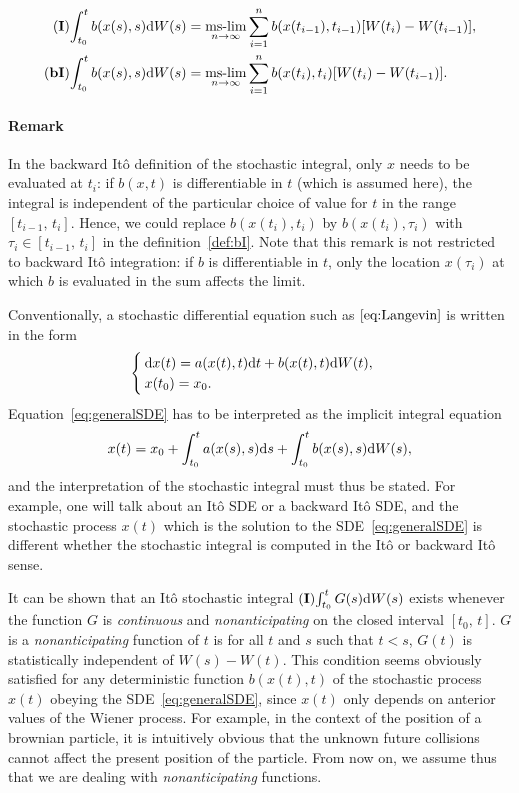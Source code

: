 \begin{subequations}
\begin{align}
        \I\int_{t_0}^t b(x(s),s) \rm dW(s) &= \mslim_{n\rightarrow \infty} \sum_{i=1}^n b(x(t_{i-1}),t_{i-1}) [W(t_i)-W(t_{i-1})], \label{def:I}\\
        \bI\int_{t_0}^t b(x(s),s) \rm dW(s) &= \mslim_{n\rightarrow \infty} \sum_{i=1}^n b(x(t_{i}),t_{i}) [W(t_i)-W(t_{i-1})]. \label{def:bI}
\end{align}
\end{subequations}
\paragraph{Remark}\label{remark:backwardIto} In the backward Itô definition of the stochastic integral, only $x$ needs to be evaluated at $t_i$: if $b(x,t)$ is differentiable in $t$ (which is assumed here), the integral is independent of the particular choice of value for $t$ in the range $[t_{i-1},\, t_i]$. Hence, we could replace $b(x(t_i),t_i)$ by $b(x(t_i),\tau_i)$ with $\tau_i \in [t_{i-1},\, t_i]$ in the definition~\eqref{def:bI}. Note that this remark is not restricted to backward Itô integration: if $b$ is differentiable in $t$, only the location $x(\tau_i)$ at which $b$ is evaluated in the sum affects the limit.

Conventionally, a stochastic differential equation such as $\eqref{eq:Langevin}$ is written in the form
\begin{equation} \label{eq:generalSDE}
	\begin{cases}
		\rm dx(t) = a(x(t),t) \rm dt + b(x(t),t) \rm dW(t),\\
		x(t_0) = x_0. 
	\end{cases}
\end{equation}
Equation~\eqref{eq:generalSDE} has to be interpreted as the implicit integral equation
\begin{equation}
	x(t) = x_0 + \int_{t_0}^t a(x(s),s) \rm ds + \int_{t_0}^t b(x(s),s) \rm dW(s),
\end{equation}
and the interpretation of the stochastic integral must thus be stated. For example, one will talk about an Itô SDE or a backward Itô SDE, and the stochastic process $x(t)$ which is the solution to the SDE~\eqref{eq:generalSDE} is different whether the stochastic integral is computed in the Itô or backward Itô sense.

It can be shown that an Itô stochastic integral $\I\int_{t_0}^t G(s) \rm dW(s)$ exists whenever the function $G$ is \textit{continuous} and \textit{nonanticipating} on the closed interval $[t_0,\,t]$. $G$ is a \textit{nonanticipating} function of $t$ is for all $t$ and $s$ such that $t<s$, $G(t)$ is statistically independent of $W(s)-W(t)$. This condition seems obviously satisfied for any deterministic function $b(x(t),t)$ of the stochastic process $x(t)$ obeying the SDE~\eqref{eq:generalSDE}, since $x(t)$ only depends on anterior values of the Wiener process. For example, in the context of the position of a brownian particle, it is intuitively obvious that the unknown future collisions cannot affect the present position of the particle. From now on, we assume thus that we are dealing with \textit{nonanticipating} functions.

